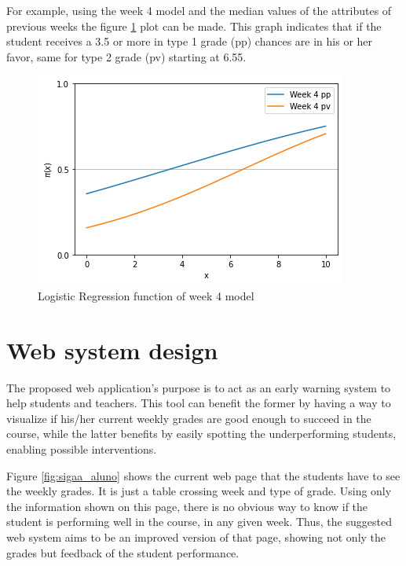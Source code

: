 For example, using the week 4 model and the median values of the attributes of previous weeks the figure \ref{fig:w4m} plot can be made. This graph indicates that if the student receives a 3.5 or more in type 1 grade (pp) chances are in his or her favor, same for type 2 grade (pv) starting at 6.55.

\begin{figure}[htb]
	\centering
  	\includegraphics[scale=.5]{Resultados/week4models.png}
  	\caption{Logistic Regression function of week 4 model}
  	\label{fig:w4m}
\end{figure}

\section{Web system design}
The proposed web application's purpose is to act as an early warning system to help students and teachers. This tool can benefit the former by having a way to visualize if his/her current weekly grades are good enough to succeed in the course, while the latter benefits by easily spotting the underperforming students, enabling possible interventions.

Figure \ref{fig:sigaa_aluno} shows the current web page that the students have to see the weekly grades. It is just a table crossing week and type of grade. Using only the information shown on this page, there is no obvious way to know if the student is performing well in the course, in any given week. Thus, the suggested web system aims to be an improved version of that page, showing not only the grades but feedback of the student performance.

